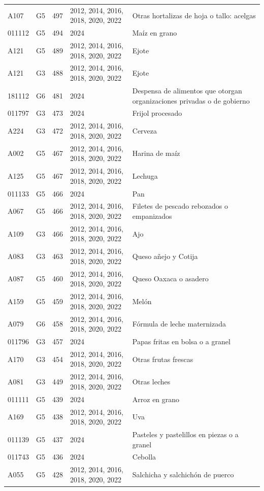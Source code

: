 \begin{table}[ht]
\begin{tabular}{llrll}
  A107 & G5 & 497 & 2012, 2014, 2016, 2018, 2020, 2022 & Otras hortalizas de hoja o tallo: acelgas \\ 
  011112 & G5 & 494 & 2024 & Maíz en grano \\ 
  A121 & G5 & 489 & 2012, 2014, 2016, 2018, 2020, 2022 & Ejote \\ 
  A121 & G3 & 488 & 2012, 2014, 2016, 2018, 2020, 2022 & Ejote \\ 
  181112 & G6 & 481 & 2024 & Despensa de alimentos que otorgan organizaciones privadas o de gobierno \\ 
  011797 & G3 & 473 & 2024 & Frijol procesado \\ 
  A224 & G3 & 472 & 2012, 2014, 2016, 2018, 2020, 2022 & Cerveza \\ 
  A002 & G5 & 467 & 2012, 2014, 2016, 2018, 2020, 2022 & Harina de maíz \\ 
  A125 & G5 & 467 & 2012, 2014, 2016, 2018, 2020, 2022 & Lechuga \\ 
  011133 & G5 & 466 & 2024 & Pan \\ 
  A067 & G5 & 466 & 2012, 2014, 2016, 2018, 2020, 2022 & Filetes de pescado rebozados o empanizados \\ 
  A109 & G3 & 466 & 2012, 2014, 2016, 2018, 2020, 2022 & Ajo \\ 
  A083 & G3 & 463 & 2012, 2014, 2016, 2018, 2020, 2022 & Queso añejo y Cotija \\ 
  A087 & G5 & 460 & 2012, 2014, 2016, 2018, 2020, 2022 & Queso Oaxaca o asadero \\ 
  A159 & G5 & 459 & 2012, 2014, 2016, 2018, 2020, 2022 & Melón \\ 
  A079 & G6 & 458 & 2012, 2014, 2016, 2018, 2020, 2022 & Fórmula de leche maternizada \\ 
  011796 & G3 & 457 & 2024 & Papas fritas en bolsa o a granel \\ 
  A170 & G3 & 454 & 2012, 2014, 2016, 2018, 2020, 2022 & Otras frutas frescas \\ 
  A081 & G3 & 449 & 2012, 2014, 2016, 2018, 2020, 2022 & Otras leches \\ 
  011111 & G5 & 439 & 2024 & Arroz en grano \\ 
  A169 & G5 & 438 & 2012, 2014, 2016, 2018, 2020, 2022 & Uva \\ 
  011139 & G5 & 437 & 2024 & Pasteles y pastelillos en piezas o a granel \\ 
  011743 & G5 & 436 & 2024 & Cebolla \\ 
  A055 & G5 & 428 & 2012, 2014, 2016, 2018, 2020, 2022 & Salchicha y salchichón de puerco \\ 

\end{tabular}
\end{table}
